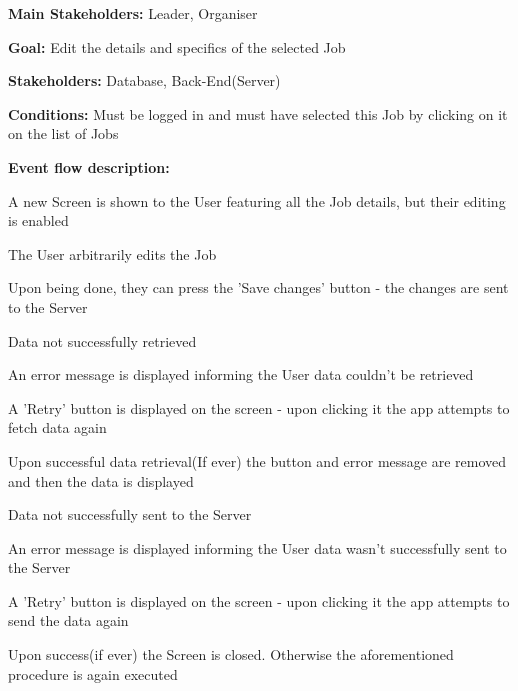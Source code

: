 				\noindent {}
				\begin{packed_item}
					\item \textbf{Main Stakeholders:} Leader, Organiser
					\item \textbf{Goal:} Edit the details and specifics of the selected Job
					\item \textbf{Stakeholders: } Database, Back-End(Server)
					\item \textbf{Conditions: } Must be logged in and must have selected this Job by clicking on it on the list of Jobs
					\item \textbf{Event flow description: }
					\begin{packed_enum}
						\item A new Screen is shown to the User featuring all the Job details, but their editing is enabled
						\item The User arbitrarily edits the Job
						\item Upon being done, they can press the 'Save changes' button - the changes are sent to the Server
					\end{packed_enum}
						
					\begin{packed_item}	
						\item[1.a] Data not successfully retrieved
						\item[] \begin{packed_enum}
							\item An error message is displayed informing the User data couldn't be retrieved
							\item A 'Retry' button is displayed on the screen - upon clicking it the app attempts to fetch data again
							\item Upon successful data retrieval(If ever) the button and error message are removed and then the data is displayed
						\end{packed_enum}
					
						
					
						\item[3.a] Data not successfully sent to the Server
						\item[] \begin{packed_enum}
							\item An error message is displayed informing the User data wasn't successfully sent to the Server
							\item A 'Retry' button is displayed on the screen - upon clicking it the app attempts to send the data again
							\item Upon success(if ever) the Screen is closed. Otherwise the aforementioned procedure is again executed
						\end{packed_enum}
					\end{packed_item}
				\end{packed_item}
					

